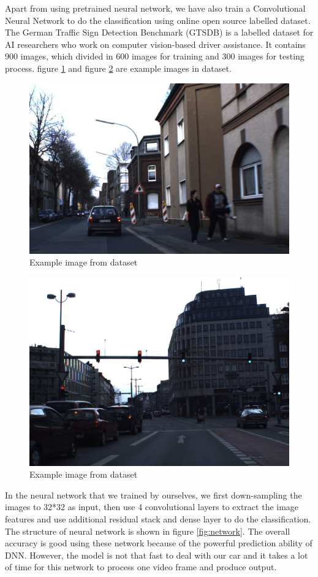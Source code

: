 \documentclass[11pt, titlepage]{article} %
\begin{document}
Apart from using pretrained neural network, we have also train a Convolutional Neural Network to do the classification using online open source labelled dataset. The German Traffic Sign Detection Benchmark (GTSDB) is a labelled dataset for AI researchers who work on computer vision-based driver assistance. It contains 900 images, which divided in 600 images for training and 300 images for testing process. figure \ref{fig:GTSDB1} and figure \ref{fig:GTSDB2} are example images in dataset.
\begin{figure}[]
	\centering
   	\includegraphics[scale=0.4]{GTSDB1.jpg}
   	\caption{Example image from dataset}
   	\label{fig:GTSDB1}
\end{figure}

\begin{figure}[]
	\centering
   	\includegraphics[scale=0.3]{GTSDB2.png}
   	\caption{Example image from dataset}
   	\label{fig:GTSDB2}
\end{figure}
In the neural network that we trained by ourselves, we first down-sampling the images to 32*32 as input, then use 4 convolutional layers to extract the image features and use additional residual stack and dense layer to do the classification. The structure of neural network is shown in figure \ref{fig:network}. The overall accuracy is good using these network because of the powerful prediction ability of DNN. However, the model is not that fast to deal with our car and it takes a lot of time for this network to process one video frame and produce output. 
\end{document}
